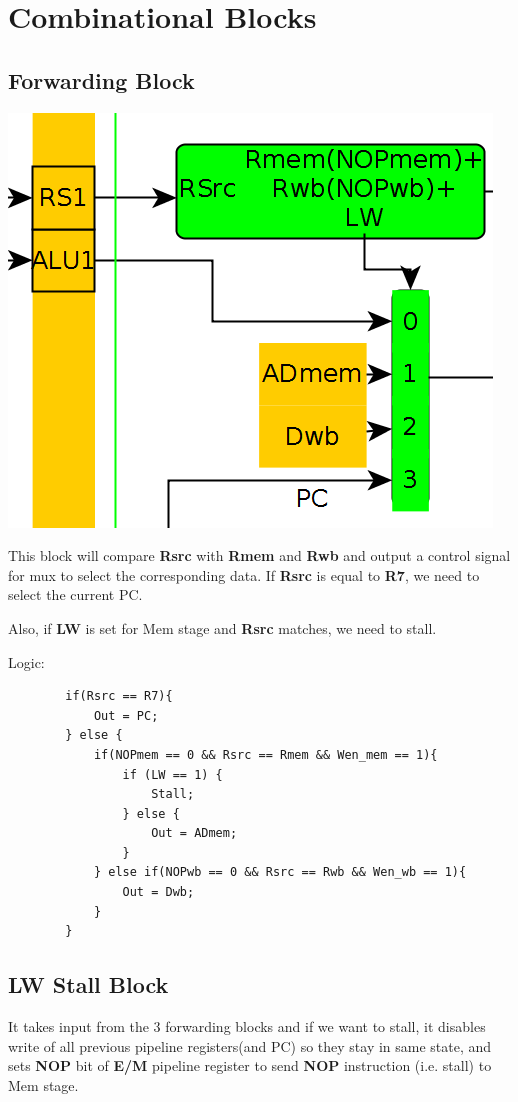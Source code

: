 \documentclass{article}
\begin{document}
\pagebreak
\section*{Combinational Blocks}
\subsection*{Forwarding Block}

\includegraphics[scale=0.7]{forwarding_block}

This block will compare \textbf{Rsrc} with \textbf{Rmem} and \textbf{Rwb} and
output a control signal for mux to select the corresponding data.
If \textbf{Rsrc} is equal to \textbf{R7}, we need to select the current PC.

Also, if \textbf{LW} is set for Mem stage and \textbf{Rsrc} matches, we need to
stall.

Logic:
    \begin{lstlisting}
        if(Rsrc == R7){
            Out = PC;
        } else {
            if(NOPmem == 0 && Rsrc == Rmem && Wen_mem == 1){
                if (LW == 1) {
                    Stall;
                } else {
                    Out = ADmem;
                }
            } else if(NOPwb == 0 && Rsrc == Rwb && Wen_wb == 1){
                Out = Dwb;
            }
        }

    \end{lstlisting}

\subsection*{LW Stall Block}
It takes input from the 3 forwarding blocks and if we want to stall, it disables
write of all previous pipeline registers(and PC) so they stay in same state, and sets 
\textbf{NOP} bit of \textbf{E/M} pipeline register to send \textbf{NOP} instruction (i.e. stall) to Mem stage.
\end{document}
